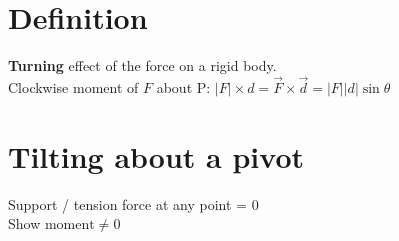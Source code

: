 \section{Definition}
\textbf{Turning} effect of the force on a rigid body.\\
Clockwise moment of $F$ about P: $|F|\times d= \vec{F}\times\vec{d} = |F||d|\sin\theta$
\section{Tilting about a pivot}
Support / tension force at any point = 0\\
Show $\text{moment} \neq 0$